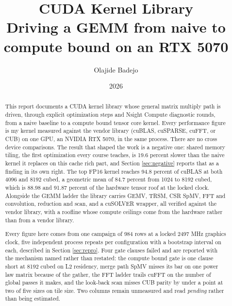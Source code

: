 \documentclass[11pt]{article}
\title{CUDA Kernel Library\\[4pt]
\large Driving a GEMM from naive to compute bound on an RTX 5070}
\author{Olajide Badejo}
\date{2026}
\begin{document}
\maketitle

\begin{abstract}
This report documents a CUDA kernel library whose general matrix multiply path is
driven, through explicit optimization steps and Nsight Compute diagnostic rounds,
from a naive baseline to a compute bound tensor core kernel. Every performance
figure is my kernel measured against the vendor library (cuBLAS, cuSPARSE,
cuFFT, or CUB) on one GPU, an NVIDIA RTX 5070, in the same process. There are no
cross device comparisons. The result that shaped the work is a negative one:
shared memory tiling, the first optimization every course teaches, is 19.6 percent
slower than the naive kernel it replaces on this cache rich part, and Section
\ref{sec:negative} reports that as a finding in its own right. The top FP16
kernel reaches 94.8 percent of cuBLAS at both 4096 and 8192 cubed, a geometric
mean of 84.7 percent from 1024 to 8192 cubed, which is 88.98 and 91.87 percent of
the hardware tensor roof at the locked clock. Alongside the GEMM ladder the library
carries GEMV, TRSM, CSR SpMV, FFT and convolution, reduction and scan, and a
cuSOLVER wrapper, all verified against the vendor library, with a roofline whose
compute ceilings come from the hardware rather than from a vendor library.

Every figure here comes from one campaign of 984 rows at a locked 2497 MHz
graphics clock, five independent process repeats per configuration with a
bootstrap interval on each, described in Section \ref{sec:repro}. Four gate
clauses failed and are reported with the mechanism named rather than restated:
the compute bound gate is one clause short at 8192 cubed on L2 residency, merge
path SpMV misses its bar on one power law matrix because of the gather, the FFT
ladder trails cuFFT on the number of global passes it makes, and the look-back
scan misses CUB parity by under a point at two of five sizes on tile size. Two
columns remain unmeasured and read \emph{pending} rather than being estimated.
\end{abstract}

\newpage
\tableofcontents
\newpage




















\nocite{*}


\end{document}
